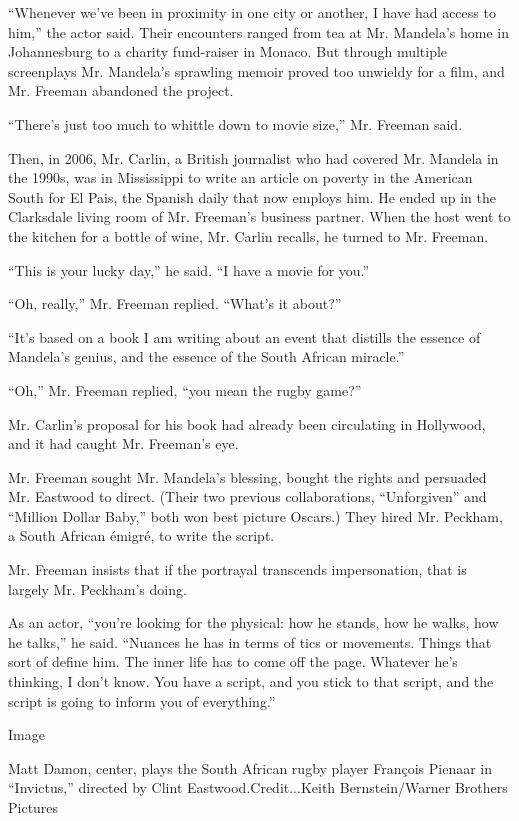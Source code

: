 ``Whenever we've been in proximity in one city or another, I have had
access to him,'' the actor said. Their encounters ranged from tea at Mr.
Mandela's home in Johannesburg to a charity fund-raiser in Monaco. But
through multiple screenplays Mr. Mandela's sprawling memoir proved too
unwieldy for a film, and Mr. Freeman abandoned the project.

``There's just too much to whittle down to movie size,'' Mr. Freeman
said.

Then, in 2006, Mr. Carlin, a British journalist who had covered Mr.
Mandela in the 1990s, was in Mississippi to write an article on poverty
in the American South for El Pais, the Spanish daily that now employs
him. He ended up in the Clarksdale living room of Mr. Freeman's business
partner. When the host went to the kitchen for a bottle of wine, Mr.
Carlin recalls, he turned to Mr. Freeman.

``This is your lucky day,'' he said. ``I have a movie for you.''

``Oh, really,'' Mr. Freeman replied. ``What's it about?''

``It's based on a book I am writing about an event that distills the
essence of Mandela's genius, and the essence of the South African
miracle.''

``Oh,'' Mr. Freeman replied, ``you mean the rugby game?''

Mr. Carlin's proposal for his book had already been circulating in
Hollywood, and it had caught Mr. Freeman's eye.

Mr. Freeman sought Mr. Mandela's blessing, bought the rights and
persuaded Mr. Eastwood to direct. (Their two previous collaborations,
``Unforgiven'' and ``Million Dollar Baby,'' both won best picture
Oscars.) They hired Mr. Peckham, a South African émigré, to write the
script.

Mr. Freeman insists that if the portrayal transcends impersonation, that
is largely Mr. Peckham's doing.

As an actor, ``you're looking for the physical: how he stands, how he
walks, how he talks,'' he said. ``Nuances he has in terms of tics or
movements. Things that sort of define him. The inner life has to come
off the page. Whatever he's thinking, I don't know. You have a script,
and you stick to that script, and the script is going to inform you of
everything.''

Image

Matt Damon, center, plays the South African rugby player François
Pienaar in ``Invictus,'' directed by Clint Eastwood.Credit...Keith
Bernstein/Warner Brothers Pictures

